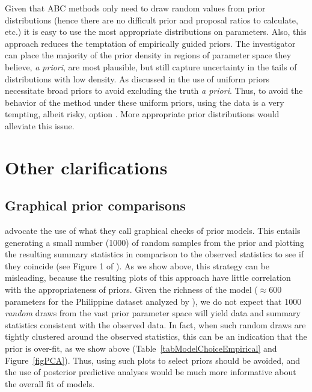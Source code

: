 \documentclass[letterpaper,12pt]{article}
\begin{document}
\begin{linenumbers}
Given that ABC methods only need to draw random values from prior distributions
(hence there are no difficult prior and proposal ratios to calculate, etc.) it
is easy to use the most appropriate distributions on parameters.
Also, this approach reduces the temptation of empirically guided priors.
The investigator can place the majority of the prior density in regions of
parameter space they believe, \emph{a priori}, are most plausible, but still
capture uncertainty in the tails of distributions with low density.
As discussed in \citet{Oaks2012} the use of uniform priors necessitate
broad priors to avoid excluding the truth \emph{a priori}.
Thus, to avoid the behavior of the method under these uniform priors, using the
data is a very tempting, albeit risky, option \citep{Hickerson2013}.
More appropriate prior distributions would alleviate this issue.



\section*{Other clarifications}

\subsection*{Graphical prior comparisons}
\citet{Hickerson2013} advocate the use of what they call graphical checks of
prior models.
This entails generating a small number (1000) of random samples from the prior
and plotting the resulting summary statistics in comparison to the observed
statistics to see if they coincide (see Figure 1 of \citet{Hickerson2013}).
As we show above, this strategy can be misleading, because the resulting plots
of this approach have little correlation with the appropriateness of priors.
Given the richness of the \msb model ($\approx 600$ parameters for the Philippine
dataset analyzed by \citet{Hickerson2013}), we do not expect that 1000
\emph{random} draws from the vast prior parameter space will yield data and
summary statistics consistent with the observed data.
In fact, when such random draws are tightly clustered around the observed
statistics, this can be an indication that the prior is over-fit, as we show
above (Table~\ref{tabModelChoiceEmpirical} and Figure~\ref{figPCA}).
Thus, using such plots to select priors should be avoided, and the use of
posterior predictive analyses would be much more informative about the overall
fit of models.


\end{linenumbers}
\end{document}

